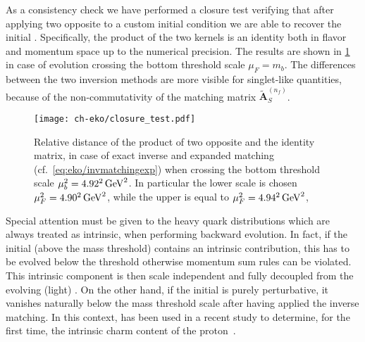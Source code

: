 As a consistency check we have performed a closure test verifying that after
applying two opposite \ekos{} to a custom initial condition
we are able to recover the initial \pdf{}. Specifically, the product of the
two kernels is an identity both in flavor and momentum space up to
the numerical precision. The results are shown in \cref{fig:eko/closure_test} in case of \nnlo{} evolution
crossing the bottom threshold scale $\mu_{F}=m_{b}$. The differences between
the two inversion methods are more visible for singlet-like quantities,
because of the non-commutativity of the matching matrix $\tilde{\mathbf{A}}_{S}^{(n_f)}$.  

\begin{figure}
    \begin{center}
    \texttt{[image: ch-eko/closure\_test.pdf]}
    \end{center}
    \caption{Relative distance of the product of two opposite \nnlo{} \ekos{}
        and the identity matrix, in case of exact inverse and expanded
        matching (cf.\ \cref{eq:eko/invmatchingexp}) when crossing the bottom
        threshold scale $\mu_{b}^2=\SI[parse-numbers=false]{4.92^2}{\GeV^2}$. In particular the lower scale is chosen $\muF^2=\SI[parse-numbers=false]{4.90^2}{\GeV^2}$, 
        while the upper is equal to $\muF^2=\SI[parse-numbers=false]{4.94^2}{\GeV^2}$, 
        \label{fig:eko/closure_test}
    }
\end{figure}

Special attention must be given to the heavy quark distributions which are
always treated as intrinsic, when performing backward evolution.
In fact, if the initial \pdf{} (above the mass threshold) contains an intrinsic contribution, this has to be evolved
below the threshold otherwise momentum sum rules can be violated.
This intrinsic component is then scale independent and fully decoupled
from the evolving (light) \pdfs.
On the other hand, if the initial \pdf{} is purely perturbative, it vanishes
naturally below the mass threshold scale after having applied the
inverse matching.
In this context, \eko{} has been used in a recent study to determine, for the first time,
the intrinsic charm content of the proton~\cite{Ball:2022qks}.
